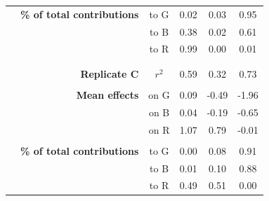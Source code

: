 \documentclass[11pt, oneside]{article}
\begin{document}
\begin{table}[H]
\begin{center}
\begin{tabular}{rrcccc}
	& \textbf{\% of total contributions} 
    &   to G &  0.02 & 0.03 & 0.95 \\ 
    & & to B &  0.38 & 0.02 & 0.61 \\
    & & to R &  0.99 & 0.00 & 0.01 \\
	& \\
	\hline
	& \\
    & \textbf{Replicate C} & $r^2$  &  0.59 & 0.32 & 0.73 \\
	& \\
	& \textbf{Mean effects} 
    &   on G & 0.09 & -0.49 & -1.96 \\
    & & on B & 0.04 & -0.19 & -0.65 \\
    & & on R & 1.07 &  0.79 & -0.01 \\
	& \\
	& \textbf{\% of total contributions} 
    &   to G &  0.00 & 0.08 & 0.91 \\
    & & to B &  0.01 & 0.10 & 0.88 \\
    & & to R &  0.49 & 0.51 & 0.00 \\
\end{tabular}
\end{center}
\end{table}
\newpage
\end{document}
